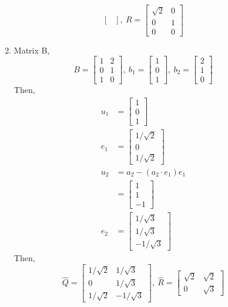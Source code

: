 \documentclass[letterpaper,10pt]{article}
\begin{document}
\begin{description}
\begin{enumerate}
\[\begin{bmatrix}
\end{bmatrix},\ R=\begin{bmatrix}
\sqrt{2} & 0\\
0 & 1\\
0 & 0
\end{bmatrix} \]
\item Matrix B,
\[B=\begin{bmatrix}
1 & 2\\ 0 & 1\\ 1 & 0
\end{bmatrix},\ b_1=\begin{bmatrix}
1\\0\\1
\end{bmatrix},\ b_2=\begin{bmatrix}
2\\1\\0
\end{bmatrix} \]
Then,
\begin{align*}
u_1 &= \begin{bmatrix}
1\\0\\1
\end{bmatrix}\\
e_1 &= \begin{bmatrix}
1/\sqrt{2}\\0\\1/\sqrt{2}
\end{bmatrix}\\
u_2&=a_2-(a_2\cdot e_1)e_1\\
&=\begin{bmatrix}
1\\1\\-1
\end{bmatrix}\\
e_2 &= \begin{bmatrix}
1/\sqrt{3}\\1/\sqrt{3}\\-1/\sqrt{3}
\end{bmatrix}
\end{align*}
Then,
\[\hat{Q}=\begin{bmatrix}
1/\sqrt{2} & 1/\sqrt{3}\\
0 & 1/\sqrt{3}\\
1/\sqrt{2} & -1/\sqrt{3}
\end{bmatrix},\ \hat{R}=\begin{bmatrix}
\sqrt{2} & \sqrt{2}\\
0 & \sqrt{3}
\end{bmatrix} \]

\end{enumerate}
\end{description}
\end{document}
